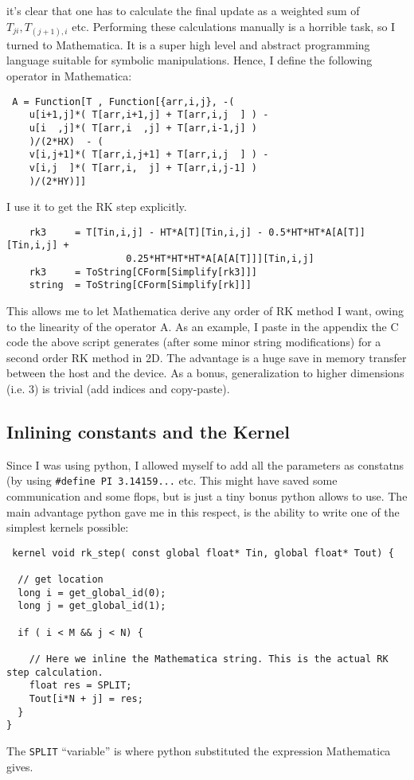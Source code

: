 \documentclass[paper=a4, fontsize=11pt]{scrartcl} %
\numberwithin{equation}{section} %
\numberwithin{figure}{section} %
\numberwithin{table}{section} %
\newcommand{\coder}[1]{\texttt{#1}}
\begin{document}
 it's clear that one has to calculate the final update as a weighted sum of $T_{ji}, T_{(j+1),i}$ etc. 
Performing these calculations manually is a horrible task, so I turned to Mathematica. It is a super high level and abstract
programming language suitable for symbolic manipulations. 
Hence, I define the following operator in Mathematica:

\begin{verbatim}
 A = Function[T , Function[{arr,i,j}, -(
    u[i+1,j]*( T[arr,i+1,j] + T[arr,i,j  ] ) -
    u[i  ,j]*( T[arr,i  ,j] + T[arr,i-1,j] )
    )/(2*HX)  - (
    v[i,j+1]*( T[arr,i,j+1] + T[arr,i,j  ] ) - 
    v[i,j  ]*( T[arr,i,  j] + T[arr,i,j-1] )
    )/(2*HY)]]
\end{verbatim}

I use it to get the RK step explicitly.
\begin{verbatim}
    rk3     = T[Tin,i,j] - HT*A[T][Tin,i,j] - 0.5*HT*HT*A[A[T]][Tin,i,j] + 
                   	 0.25*HT*HT*HT*A[A[A[T]]][Tin,i,j]
    rk3     = ToString[CForm[Simplify[rk3]]]
    string  = ToString[CForm[Simplify[rk]]]
\end{verbatim}

This allows me to let Mathematica derive any order of RK method I want, owing to the linearity of the operator A. 
As an example, I paste in the appendix the C code the above script generates (after some minor string modifications) for a
second order RK method in 2D. 
The advantage is a huge save in memory transfer between the host and the device. As a bonus, generalization to higher
dimensions (i.e. 3) is trivial (add indices and copy-paste).

\subsection{Inlining constants and the Kernel}
Since I was using python, I allowed myself to add all the parameters as constatns (by using \coder{\#define PI 3.14159...} etc. This 
might have saved some communication and some flops, but is just a tiny bonus python allows to use. The main advantage python gave me
in this respect, is the ability to write one of the simplest kernels possible:
\begin{verbatim}
 kernel void rk_step( const global float* Tin, global float* Tout) {

  // get location
  long i = get_global_id(0);  
  long j = get_global_id(1);  

  if ( i < M && j < N) {
  
    // Here we inline the Mathematica string. This is the actual RK step calculation.
    float res = SPLIT;
    Tout[i*N + j] = res;
  }
}

\end{verbatim}
The \coder{SPLIT} ``variable'' is where python substituted the expression Mathematica gives.
\end{document}

